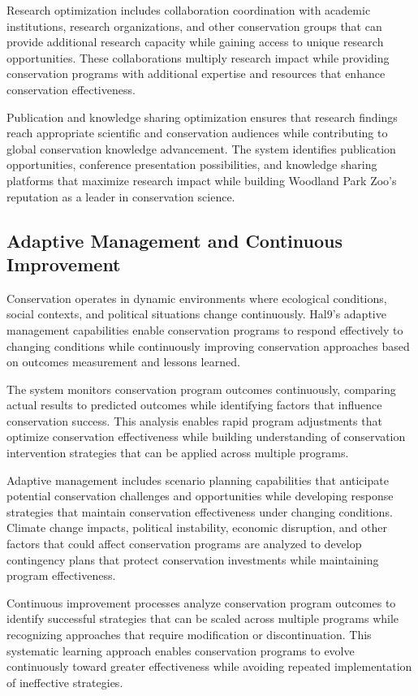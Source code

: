 \documentclass[
  Letterpaper,
]{scrbook}
\begin{document}
Research optimization includes collaboration coordination with academic
institutions, research organizations, and other conservation groups that
can provide additional research capacity while gaining access to unique
research opportunities. These collaborations multiply research impact
while providing conservation programs with additional expertise and
resources that enhance conservation effectiveness.

Publication and knowledge sharing optimization ensures that research
findings reach appropriate scientific and conservation audiences while
contributing to global conservation knowledge advancement. The system
identifies publication opportunities, conference presentation
possibilities, and knowledge sharing platforms that maximize research
impact while building Woodland Park Zoo's reputation as a leader in
conservation science.

\subsection{Adaptive Management and Continuous
Improvement}\label{adaptive-management-and-continuous-improvement}

Conservation operates in dynamic environments where ecological
conditions, social contexts, and political situations change
continuously. Hal9's adaptive management capabilities enable
conservation programs to respond effectively to changing conditions
while continuously improving conservation approaches based on outcomes
measurement and lessons learned.

The system monitors conservation program outcomes continuously,
comparing actual results to predicted outcomes while identifying factors
that influence conservation success. This analysis enables rapid program
adjustments that optimize conservation effectiveness while building
understanding of conservation intervention strategies that can be
applied across multiple programs.

Adaptive management includes scenario planning capabilities that
anticipate potential conservation challenges and opportunities while
developing response strategies that maintain conservation effectiveness
under changing conditions. Climate change impacts, political
instability, economic disruption, and other factors that could affect
conservation programs are analyzed to develop contingency plans that
protect conservation investments while maintaining program
effectiveness.

Continuous improvement processes analyze conservation program outcomes
to identify successful strategies that can be scaled across multiple
programs while recognizing approaches that require modification or
discontinuation. This systematic learning approach enables conservation
programs to evolve continuously toward greater effectiveness while
avoiding repeated implementation of ineffective strategies.
\end{document}
